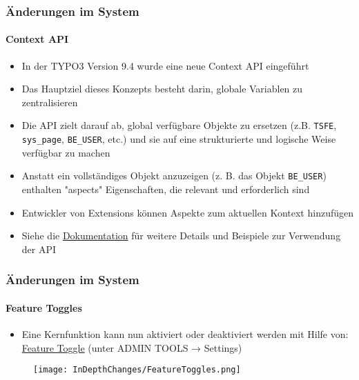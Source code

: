 
\begin{frame}[fragile]
	\frametitle{Änderungen im System}
	\framesubtitle{Context API}

	\begin{itemize}
		\item In der TYPO3 Version 9.4 wurde eine neue Context API eingeführt
		\item Das Hauptziel dieses Konzepts besteht darin, globale Variablen zu zentralisieren
		\item Die API zielt darauf ab, global verfügbare Objekte zu ersetzen (z.B.
			\texttt{TSFE}, \texttt{sys\_page}, \texttt{BE\_USER}, etc.) und sie
			auf eine strukturierte und logische Weise verfügbar zu machen
		\item Anstatt ein vollständiges Objekt anzuzeigen (z. B. das Objekt \texttt{BE\_USER})
			 enthalten "aspects" Eigenschaften, die relevant
			und erforderlich sind
		\item Entwickler von Extensions können Aspekte zum aktuellen Kontext hinzufügen
		\item Siehe die \href{https://docs.typo3.org/typo3cms/extensions/core/latest/Changelog/9.4/Feature-85389-ContextAPIForConsistentDataHandling.rst}{Dokumentation}
			für weitere Details und Beispiele zur Verwendung der API
	\end{itemize}

\end{frame}


\begin{frame}[fragile]
	\frametitle{Änderungen im System}
	\framesubtitle{Feature Toggles}

	\begin{itemize}
		\item Eine Kernfunktion kann nun aktiviert oder deaktiviert werden mit Hilfe von:
			\href{https://docs.typo3.org/typo3cms/CoreApiReference/ApiOverview/FeatureToggles/}{Feature Toggle}
			(unter ADMIN TOOLS → Settings)
	\end{itemize}
	\begin{figure}
		\texttt{[image: InDepthChanges/FeatureToggles.png]}
	\end{figure}

\end{frame}


